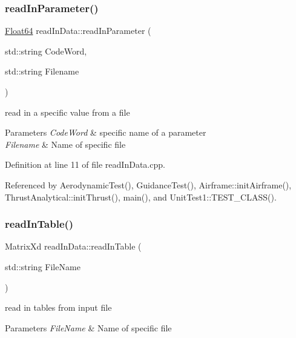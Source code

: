 \subsubsection{\texorpdfstring{read\+In\+Parameter()}{readInParameter()}}
{\footnotesize\ttfamily \hyperlink{group___tools_ga3f1431cb9f76da10f59246d1d743dc2c}{Float64} read\+In\+Data\+::read\+In\+Parameter (\begin{DoxyParamCaption}\item[{std\+::string}]{Code\+Word,  }\item[{std\+::string}]{Filename }\end{DoxyParamCaption})}



read in a specific value from a file 


\begin{DoxyParams}{Parameters}
{\em Code\+Word} & specific name of a parameter \\
\hline
{\em Filename} & Name of specific file \\
\hline
\end{DoxyParams}


Definition at line 11 of file read\+In\+Data.\+cpp.



Referenced by Aerodynamic\+Test(), Guidance\+Test(), Airframe\+::init\+Airframe(), Thrust\+Analytical\+::init\+Thrust(), main(), and Unit\+Test1\+::\+T\+E\+S\+T\+\_\+\+C\+L\+A\+S\+S().

\mbox{\label{classread_in_data_af616573832efc2c27f07f5f6877b1386}} 
\subsubsection{\texorpdfstring{read\+In\+Table()}{readInTable()}}
{\footnotesize\ttfamily Matrix\+Xd read\+In\+Data\+::read\+In\+Table (\begin{DoxyParamCaption}\item[{std\+::string}]{File\+Name }\end{DoxyParamCaption})}



read in tables from input file 


\begin{DoxyParams}{Parameters}
{\em File\+Name} & Name of specific file \\
\hline
\end{DoxyParams}


